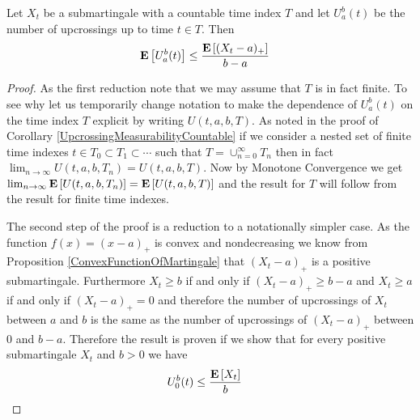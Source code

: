\begin{lem}\label{UpcrossingInequalityDiscrete}Let $X_t$ be a
  submartingale with a countable time index $T$ and let $U_a^b(t)$ be the number of upcrossings up to
  time $t \in T$.  Then
\begin{align*}
\textbf{E}\left[U_a^b(t)\right] &\leq \frac{\textbf{E}\left[(X_t-a)_+\right]}{b-a}
\end{align*}
\end{lem}
\begin{proof}
As the first reduction note that we may assume that $T$ is in fact
finite.  To see why let us temporarily change notation to make the dependence of $U_a^b(t)$ on the
time index $T$ explicit by writing $U(t, a, b, T)$.  As noted in the
proof of Corollary \ref{UpcrossingMeasurabilityCountable} if we consider a nested set of finite time indexes $t
\in T_0 \subset T_1 \subset \dotsb$ such that $T = \cup_{n=0}^\infty
T_n$ then in fact $\lim_{n \to \infty} U(t, a, b, T_n) = U(t,
a,b,T)$.  Now by Monotone Convergence we get $\lim_{n \to \infty}
\textbf{E}\left[U(t, a, b, T_n)\right] = \textbf{E}\left[ U(t,a,b,T)\right]$ and the
result for $T$ will follow from the result for finite time indexes.

The second step of the proof is a reduction to a notationally simpler
case.  As the function $f(x) = (x -a)_+$ is convex and nondecreasing we know
from Proposition \ref{ConvexFunctionOfMartingale} that $(X_t - a)_+$ is a positive submartingale.  Furthermore $X_t \geq b$ if
and only if $(X_t - a)_+ \geq b-a$ and $X_t \geq a$ if and only if
$(X_t -a)_+ = 0$ and therefore the number of upcrossings of $X_t$
between $a$ and $b$ is the same as the number of upcrossings of $(X_t
- a)_+$ between $0$ and $b-a$.  Therefore the result is proven if we
show that for every positive submartingale $X_t$ and $b>0$ we have 
\begin{align*}
U_0^b (t) &\leq \frac{\textbf{E}\left[X_t\right]}{b}
\end{align*}


\end{proof}
